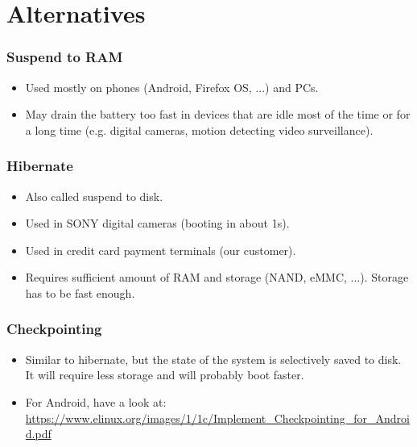 \section{Alternatives}
\begin{frame}
\frametitle{Suspend to RAM}
\begin{itemize}
\item Used mostly on phones (Android, Firefox OS, ...) and PCs.
\item May drain the battery too fast in devices that are idle most of the time or
      for a long time (e.g. digital cameras, motion detecting video surveillance).
\end{itemize}
\end{frame}

\begin{frame}
\frametitle{Hibernate}
\begin{itemize}
\item Also called suspend to disk.
\item Used in SONY digital cameras (booting in about 1s).
\item Used in credit card payment terminals (our customer).
\item Requires sufficient amount of RAM and storage (NAND, eMMC, ...).
      Storage has to be fast enough.
\end{itemize}
\end{frame}

\begin{frame}
\frametitle{Checkpointing}
\begin{itemize}
\item Similar to hibernate, but the state of the system is selectively saved
      to disk. It will require less storage and will probably boot faster.
\item For Android, have a look at:
      \url{https://www.elinux.org/images/1/1c/Implement_Checkpointing_for_Android.pdf}
\end{itemize}
\end{frame}

